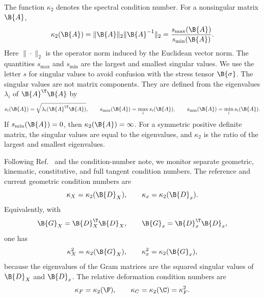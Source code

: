 The function $\kappa_2$ denotes the spectral condition number. For a
nonsingular matrix $\B{A}$,
\begin{equation}
    \kappa_2(\B{A})
    =
    \|\B{A}\|_2\|\B{A}^{-1}\|_2
    =
    \frac{s_{\max}(\B{A})}{s_{\min}(\B{A})}.
\end{equation}
Here $\|\cdot\|_2$ is the operator norm induced by the Euclidean vector norm.
The quantities $s_{\max}$ and $s_{\min}$ are the largest and smallest singular
values. We use the letter $s$ for singular values to avoid confusion with the
stress tensor $\B{\sigma}$. The singular values are not matrix components.
They are defined from the eigenvalues $\lambda_i$ of $\B{A}^{\T}\B{A}$ by
\begin{equation}
    s_i(\B{A})
    =
    \sqrt{\lambda_i(\B{A}^{\T}\B{A})},
    \qquad
    s_{\max}(\B{A})=\max_i s_i(\B{A}),
    \qquad
    s_{\min}(\B{A})=\min_i s_i(\B{A}).
\end{equation}
If $s_{\min}(\B{A})=0$, then $\kappa_2(\B{A})=\infty$. For a symmetric
positive definite matrix, the singular values are equal to the eigenvalues,
and $\kappa_2$ is the ratio of the largest and smallest eigenvalues.

Following Ref.~\cite{fried_condition_1972} and the condition-number note, we
monitor separate geometric, kinematic, constitutive, and full tangent condition
numbers. The reference and current geometric condition numbers are
\begin{equation}
    \kappa_X = \kappa_2(\B{D}_X),
    \qquad
    \kappa_x = \kappa_2(\B{D}_x).
\end{equation}
Equivalently, with
\begin{equation}
    \B{G}_X=\B{D}_X^\T\B{D}_X,
    \qquad
    \B{G}_x=\B{D}_x^\T\B{D}_x,
\end{equation}
one has
\begin{equation}
    \kappa_X^2=\kappa_2(\B{G}_X),
    \qquad
    \kappa_x^2=\kappa_2(\B{G}_x),
\end{equation}
because the eigenvalues of the Gram matrices are the squared singular values
of $\B{D}_X$ and $\B{D}_x$. The relative deformation condition numbers are
\begin{equation}
    \kappa_F = \kappa_2(\F),
    \qquad
    \kappa_C = \kappa_2(\C) = \kappa_F^2 .
\end{equation}

